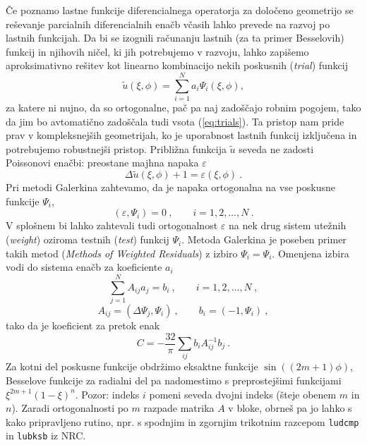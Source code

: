 \documentclass{article}
\begin{document}
Če poznamo lastne funkcije diferencialnega operatorja za določeno
geometrijo se reševanje parcialnih diferencialnih enačb
včasih lahko prevede na razvoj po lastnih funkcijah. Da bi se izognili
računanju lastnih (za ta primer Besselovih) funkcij in njihovih ničel,
ki jih potrebujemo v razvoju, lahko zapišemo aproksimativno
rešitev kot linearno kombinacijo nekih poskusnih ({\sl trial\/})
funkcij
\begin{equation}
\tilde{u}(\xi,\phi) = \sum\limits_{i=1}^N  a_i \Psi_i(\xi,\phi),
\label{eq:trials}
\end{equation}
za katere ni nujno, da so ortogonalne, pač pa naj zadoščajo
robnim pogojem, tako da jim bo avtomatično zadoščala tudi
vsota (\ref{eq:trials}). Ta pristop nam pride prav v kompleksnejših geometrijah,
ko je uporabnost lastnih funkcij izključena in potrebujemo robustnejši pristop.
Približna funkcija $\tilde{u}$ seveda ne zadosti Poissonovi enačbi: preostane majhna napaka $\varepsilon$
\begin{equation*}
  \Delta \tilde{u}(\xi,\phi) + 1 = \varepsilon(\xi,\phi) \>.
\end{equation*}
Pri metodi Galerkina zahtevamo, da je napaka ortogonalna
na vse poskusne funkcije $\Psi_i$,
\begin{equation*}
  (\varepsilon,\Psi_i) = 0 \>, \qquad  i = 1,2,\dots, N \>.
\end{equation*}
V splošnem bi lahko zahtevali tudi ortogonalnost $\varepsilon$
na nek drug sistem utežnih ({\sl weight\/}) oziroma testnih
({\sl test\/}) funkcij $\Psi_i$.  Metoda Galerkina je poseben
primer takih metod ({\sl Methods of Weighted Residuals\/})
z izbiro $\Psi_i = \Psi_i$.  Omenjena izbira vodi do sistema
enačb za koeficiente $a_i$
\begin{equation}
  \sum_{j=1}^N A_{ij} a_j = b_i\>, \qquad  i = 1,2,\dots, N \>,
  \label{eq:sistem}
\end{equation}
\[
A_{ij} = (\Delta \Psi_j,\Psi_i) \>, \qquad b_i = (-1,\Psi_i) \>,
\]
tako da je koeficient za pretok enak
\begin{equation*}
C =-\frac{32}{ \pi} \sum_{ij}  b_i A_{ij}^{-1} b_j \>.
\end{equation*}
Za kotni del poskusne funkcije obdržimo eksaktne funkcije
$\sin((2m+1)\phi)$, Besselove funkcije za radialni del
pa nadomestimo s preprostejšimi funkcijami $\xi^{2m+1}(1-\xi)^n$.
Pozor: indeks $i$ pomeni seveda dvojni indeks (šteje obenem
$m$ in $n$).  Zaradi ortogonalnosti po $m$ razpade matrika $A$ v bloke,
obrneš pa jo lahko s kako pripravljeno rutino, npr. s spodnjim
in zgornjim trikotnim razcepom {\tt ludcmp} in {\tt lubksb} iz NRC.
\newpage
\end{document}
